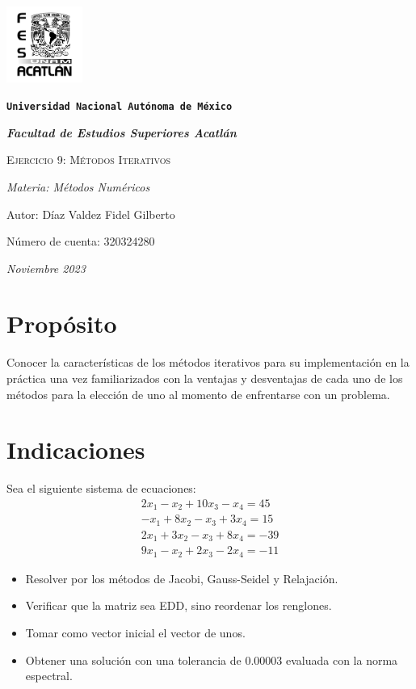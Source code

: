 \documentclass{article}
\begin{document}
\begin{titlepage}
   \centering
   {\includegraphics[width=2.5cm]{logo.png}\par}
   {\texttt{\bfseries \LARGE Universidad Nacional Autónoma de México} \par}
   \vspace{1cm}
   {\itshape \Large \bfseries Facultad de Estudios Superiores Acatlán \par}
   \vspace{3cm}
   {\scshape \Huge Ejercicio 9: Métodos Iterativos \par}
   \vspace {3cm}
   {\slshape \Large Materia: Métodos Numéricos \par}
   \vspace{2cm}
   {\Large Autor: Díaz Valdez Fidel Gilberto\par}
   {\Large Número de cuenta: 320324280\par}
   \vfill
   {\itshape Noviembre 2023 \par}
\end{titlepage}


\section{Propósito}
Conocer la características de los métodos iterativos para su implementación en la práctica una vez
familiarizados con la ventajas y desventajas de cada uno de los métodos para la elección de uno al
momento de enfrentarse con un problema.


\section{Indicaciones}
Sea el siguiente sistema de ecuaciones:
\begin{equation*}
   \begin{matrix}
       2x_1 -x_2 + 10x_3 - x_4 = 45 \\
       -x_1 + 8x_2 - x_3 + 3x_4 = 15 \\
       2x_1 + 3x_2 - x_3 +8x_4 = -39 \\
       9x_1 -x_2 +2x_3 - 2x_4 = -11
   \end{matrix}
\end{equation*}
\begin{itemize}
   \item Resolver por los métodos de Jacobi, Gauss-Seidel y Relajación.
   \item Verificar que la matriz sea EDD, sino reordenar los renglones.
   \item Tomar como vector inicial el vector de unos.
   \item Obtener una solución con una tolerancia de $0.00003$ evaluada con la norma espectral. 
\end{itemize}
\end{document}
